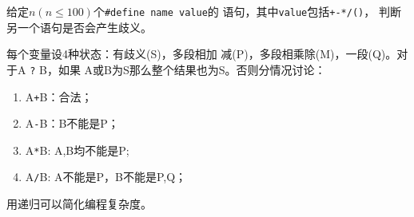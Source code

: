 \begin{prob}
	给定$n(n \le 100)$个\texttt{\#define name value}的
	语句，其中\texttt{value}包括\texttt{+-*/()}，
	判断另一个语句是否会产生歧义。
\end{prob}

\begin{sol}
	每个变量设4种状态：有歧义(S)，多段相加
	减(P)，多段相乘除(M)，一段(Q)。对于A \texttt{?} B，如果
	A或B为S那么整个结果也为S。否则分情况讨论：
	\begin{enumerate}
		\item A\texttt{+}B：合法；
		\item A\texttt{-}B：B不能是P；
		\item A\texttt{*}B: A,B均不能是P;
		\item A\texttt{/}B: A不能是P，B不能是P,Q；
	\end{enumerate}
	用递归可以简化编程复杂度。
\end{sol}
